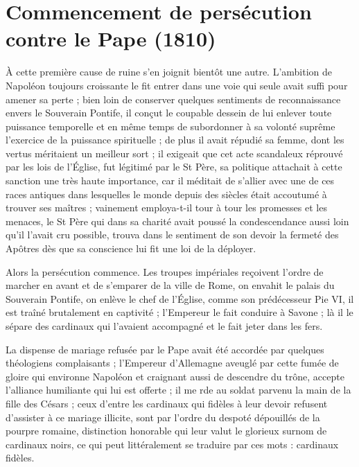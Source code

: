 \documentclass[11pt,a4paper]{report}
\begin{document}
\section*{Commencement de persécution contre le Pape (1810)}

À cette première cause de ruine s'en joignit bientôt une autre. L'ambition de Napoléon toujours croissante le fit entrer dans une voie qui seule avait suffi pour amener sa perte ; bien loin de conserver quelques sentiments de reconnaissance envers le Souverain Pontife, il conçut le coupable dessein de lui enlever toute puissance temporelle et en même temps de subordonner à sa volonté suprême l'exercice de la puissance spirituelle ; de plus il avait répudié sa femme, dont les vertus méritaient un meilleur sort ; il exigeait que cet acte scandaleux réprouvé par les lois de l'Église, fut légitimé par le St Père, sa politique attachait à cette sanction une très haute importance, car il méditait de s'allier avec une de ces races antiques dans lesquelles le monde depuis des siècles était accoutumé à trouver ses maîtres ; vainement employa-t-il tour à tour les promesses et les menaces, le St Père qui dans sa charité avait poussé la condescendance aussi loin qu'il l'avait cru possible, trouva dans le sentiment de son devoir la fermeté des Apôtres dès que sa conscience lui fit une loi de la déployer.

Alors la persécution commence. Les troupes impériales reçoivent l'ordre de marcher en avant et de s'emparer de la ville de Rome, on envahit le palais du Souverain Pontife, on enlève le chef de l'Église, comme son prédécesseur Pie VI, il est traîné brutalement en captivité ; l'Empereur le fait conduire à Savone ; là il le sépare des cardinaux qui l'avaient accompagné et le fait jeter dans les fers.

La dispense de mariage refusée par le Pape avait été accordée par quelques théologiens complaisants ; l'Empereur d'Allemagne aveuglé par cette fumée de gloire qui environne Napoléon et craignant aussi de descendre du trône, accepte l'alliance humiliante qui lui est offerte ; il me rde au soldat parvenu la main de la fille des Césars ; ceux d'entre les cardinaux qui fidèles à leur devoir refusent d'assister à ce mariage illicite, sont par l'ordre du despoté dépouillés de la pourpre romaine, distinction honorable qui leur valut le glorieux surnom de cardinaux noirs, ce qui peut littéralement se traduire par ces mots : cardinaux fidèles.
\end{document}
